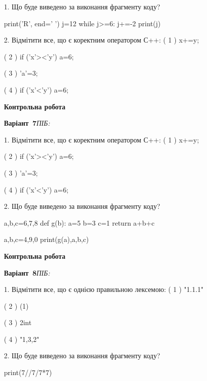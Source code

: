 \documentclass[11pt]{article}
\begin{document}
1. Що буде виведено за виконання фрагменту коду?

print('R', end=' ')
j=12
while j>=6:
    j+=-2
print(j)


2. %
Відмітити все, що є коректним оператором С++:
( 1 ) x+=y;

( 2 ) if ('x'><'y') a=6;

( 3 ) 'a'=3;

( 4 ) if ('x'<'y') a=6;



\newpage

\newpage

{\large\textbf{Контрольна робота}}

\textbf{Варіант \No\,7}\hfill \textit{ПІБ:}\,\underline{\hspace{60mm}}
\vspace{4mm}

1. %
Відмітити все, що є коректним оператором С++:
( 1 ) x+=y;

( 2 ) if ('x'><'y') a=6;

( 3 ) 'a'=3;

( 4 ) if ('x'<'y') a=6;

2. Що буде виведено за виконання фрагменту коду?

a,b,c=6,7,8
def g(b):
    a=5
    b=3
    c=1
    return a+b+c

a,b,c=4,9,0
print(g(a),a,b,c)



\newpage

\newpage

{\large\textbf{Контрольна робота}}

\textbf{Варіант \No\,8}\hfill \textit{ПІБ:}\,\underline{\hspace{60mm}}
\vspace{4mm}

1. %
Відмітити все, що є однією правильною лексемою:
( 1 ) "1.1.1"

( 2 ) (1)

( 3 ) 2int

( 4 ) "1,3,2"

2. Що буде виведено за виконання фрагменту коду?

print(7//7/7*7)

\end{document}
